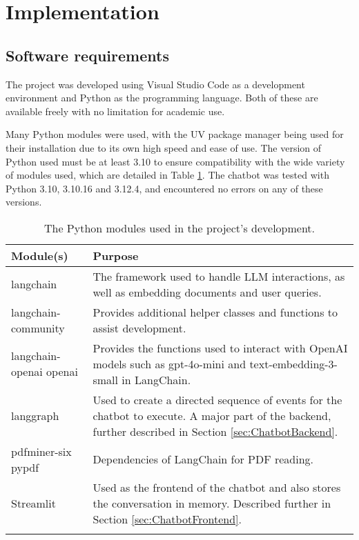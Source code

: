 \section{Implementation}\label{sec:Implementation}

\subsection{Software requirements}
The project was developed using Visual Studio Code as a development environment and Python as the programming language.
Both of these are available freely with no limitation for academic use.

\para Many Python modules were used, with the UV package manager \autocite{astralUv} being used for their installation 
due to its own high speed and ease of use. The version of Python used must be at least 3.10 to ensure compatibility with the wide variety 
of modules used, which are detailed in Table \ref{tab:PythonModules}. The chatbot was tested with Python 3.10, 3.10.16 and 3.12.4,
and encountered no errors on any of these versions.

\begin{longtable}{ | p{} | p{} | }
    \hline
    \cellcolor{blue!25} Module(s) & \cellcolor{blue!25} Purpose \\
    \hline
    langchain & The framework used to handle LLM interactions, as well as embedding documents and user queries. \\
    \hline
    langchain-community & Provides additional helper classes and functions to assist development. \\
    \hline 
    langchain-openai \newline 
    openai & Provides the functions used to interact with OpenAI models such as gpt-4o-mini and text-embedding-3-small in LangChain. \\
    \hline 
    langgraph & Used to create a directed sequence of events for the chatbot to execute. A major part of the backend, further described 
    in Section \ref{sec:ChatbotBackend}. \\
    \hline
    pdfminer-six \newline 
    pypdf & Dependencies of LangChain for PDF reading. \\
    \hline 
    Streamlit & Used as the frontend of the chatbot and also stores the conversation in memory. Described further in Section 
    \ref{sec:ChatbotFrontend}. \\
    \hline
    \caption{The Python modules used in the project's development.}\label{tab:PythonModules}
\end{longtable}



